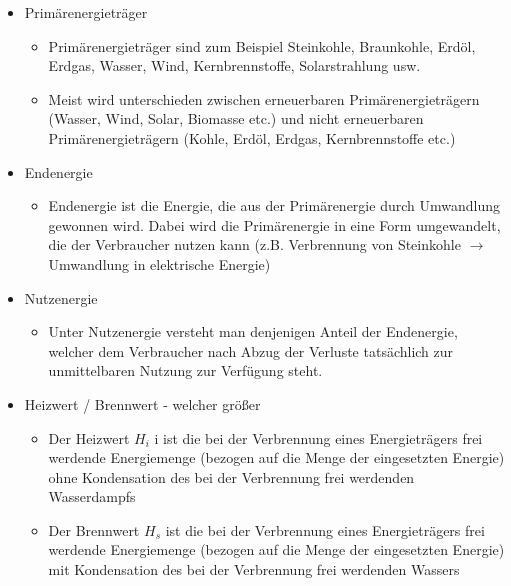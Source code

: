 \documentclass[fleqn,twoside,dvipsnames]{article}
\begin{document}
\begin{itemize}
\begin{itemize}
                        \end{itemize}
                    \item Primärenergieträger
                        \begin{itemize}
                            \item Primärenergieträger sind zum Beispiel Steinkohle, Braunkohle, Erdöl, Erdgas, Wasser, Wind,
                            Kernbrennstoffe, Solarstrahlung usw.
                            \item Meist wird unterschieden zwischen erneuerbaren Primärenergieträgern (Wasser, Wind, Solar,
                            Biomasse etc.) und nicht erneuerbaren Primärenergieträgern (Kohle, Erdöl, Erdgas,
                            Kernbrennstoffe etc.)
                        \end{itemize}
                    \item Endenergie
                        \begin{itemize}
                            \item Endenergie ist die Energie, die aus der Primärenergie durch Umwandlung gewonnen wird. Dabei
                            wird die Primärenergie in eine Form umgewandelt, die der Verbraucher nutzen kann
                            (z.B. Verbrennung von Steinkohle $\rightarrow$ Umwandlung in elektrische Energie)
                        \end{itemize}
                    \item Nutzenergie
                        \begin{itemize}
                            \item Unter Nutzenergie versteht man denjenigen Anteil der Endenergie, welcher dem Verbraucher
                            nach Abzug der Verluste tatsächlich zur unmittelbaren Nutzung zur Verfügung steht.
                        \end{itemize}
                    \item Heizwert / Brennwert - welcher größer
                        \begin{itemize}
                            \item Der Heizwert $H_i$ i ist die bei der Verbrennung eines Energieträgers frei werdende Energiemenge (bezogen auf die Menge der eingesetzten Energie) ohne Kondensation des bei der Verbrennung frei werdenden Wasserdampfs
                            \item Der Brennwert $H_s$ ist die bei der Verbrennung eines Energieträgers frei werdende Energiemenge (bezogen auf die Menge der eingesetzten Energie) mit Kondensation des bei der Verbrennung frei werdenden Wassers

\end{itemize}
\end{itemize}
\end{document}
